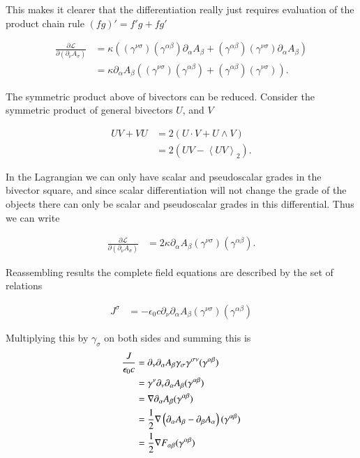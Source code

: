 \documentclass{article}
\newcommand{\LL}[0]{\mathcal{L}}
\newcommand{\PD}[2]{\frac{\partial {#2}}{\partial {#1}}}
\newcommand{\grad}[0]{\nabla}
\newcommand{\gpgrade}[2] {{\left\langle{{#1}}\right\rangle}_{#2}}
\newcommand{\gpgradetwo}[1] {\gpgrade{#1}{2}}
\begin{document}
This makes it clearer that the differentiation really just requires evaluation of the product chain rule $(fg)' = f'g + f g'$

\begin{align*}
\PD{(\partial_\nu A_\sigma)}{\LL} 
&=
\kappa
\left(
(\gamma^{\nu\sigma}) (\gamma^{\alpha\beta}) \partial_\alpha A_\beta 
+(\gamma^{\alpha\beta}) (\gamma^{\nu\sigma}) \partial_\alpha A_\beta
\right) \\
&= \kappa \partial_\alpha A_\beta \left( (\gamma^{\nu\sigma}) (\gamma^{\alpha\beta}) +(\gamma^{\alpha\beta}) (\gamma^{\nu\sigma}) \right).
\end{align*}

The symmetric product above of bivectors can be reduced.  Consider the symmetric product of general bivectors $U$, and $V$

\begin{align*}
U V + V U 
&= 2 (U \cdot V + U \wedge V) \\
&= 2 (U V - \gpgradetwo{U V} ).
\end{align*}

In the Lagrangian we can only have scalar and pseudoscalar grades in the bivector square, and 
since scalar differentiation will not change the grade of the objects there can only be scalar and pseudoscalar grades in this differential.  Thus we can write

\begin{align*}
\PD{(\partial_\nu A_\sigma)}{\LL} &= 2 \kappa \partial_\alpha A_\beta (\gamma^{\nu\sigma}) (\gamma^{\alpha\beta}).
\end{align*}

Reassembling results the complete field equations are described by the set of relations

\begin{align*}
J^\sigma &= -\epsilon_0 c \partial_\nu \partial_\alpha A_\beta (\gamma^{\nu\sigma}) (\gamma^{\alpha\beta})
\end{align*}

Multiplying this by $\gamma_\sigma$ on both sides and summing this is
\begin{align*}
\frac{J}{\epsilon_0 c}
&= \partial_\nu \partial_\alpha A_\beta \gamma_\sigma \gamma^{\sigma\nu} (\gamma^{\alpha\beta}) \\
&= \gamma^\nu \partial_\nu \partial_\alpha A_\beta (\gamma^{\alpha\beta}) \\
&= \grad \partial_\alpha A_\beta (\gamma^{\alpha\beta}) \\
&= \inv{2} \grad \left(\partial_\alpha A_\beta - \partial_\beta A_\alpha \right) (\gamma^{\alpha\beta}) \\
&= \inv{2} \grad F_{\alpha\beta} (\gamma^{\alpha\beta}) \\
\end{align*}
\end{document}

